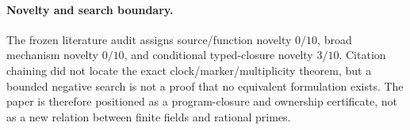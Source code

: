 \paragraph{Novelty and search boundary.}
The frozen literature audit assigns source/function novelty $0/10$, broad
mechanism novelty $0/10$, and conditional typed-closure novelty $3/10$.
Citation chaining did not locate the exact clock/marker/multiplicity theorem,
but a bounded negative search is not a proof that no equivalent formulation
exists. The paper is therefore positioned as a program-closure and ownership
certificate, not as a new relation between finite fields and rational primes.
